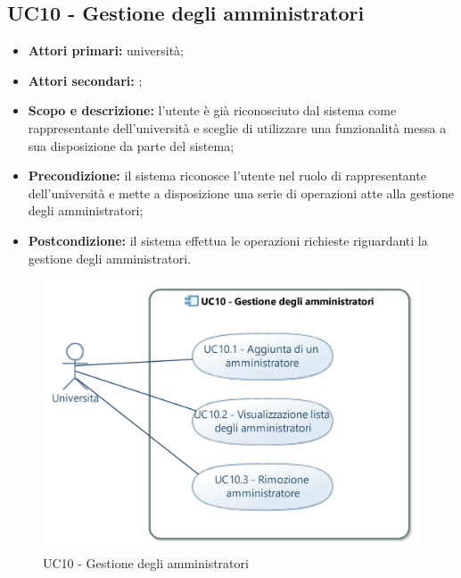 \documentclass[AnalisiDeiRequisiti.tex]{subfiles}
\begin{document}
\subsection{UC10 - Gestione degli amministratori}
\begin{itemize}
	\item \textbf{Attori primari:} università;
	\item \textbf{Attori secondari:} ;
	\item \textbf{Scopo e descrizione:} l'utente è già riconosciuto dal sistema come rappresentante dell'università e sceglie di utilizzare una funzionalità messa a sua disposizione da parte del sistema;
	\item \textbf{Precondizione:} il sistema riconosce l'utente nel ruolo di rappresentante dell'università e mette a disposizione una serie di operazioni atte alla gestione degli amministratori; 
	\item \textbf{Postcondizione:} il sistema effettua le operazioni richieste riguardanti la gestione degli amministratori.
\end{itemize}

\begin{figure}[H]
	\centering
	\includegraphics[width=1.0\linewidth]{UC10.jpg}
	\caption{UC10 - Gestione degli amministratori}
	\label{fig:UC10 - Gestione degli amministratori}
\end{figure}
\end{document}
